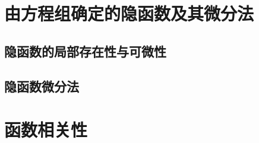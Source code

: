 \section{由方程组确定的隐函数及其微分法}
\subsection{隐函数的局部存在性与可微性}
\subsection{隐函数微分法}

\pushstar
\section{函数相关性}
\popstar

\begin{exercise}
\item
\end{exercise}
\begin{exercise*}
\item
\end{exercise*}




\endinput
